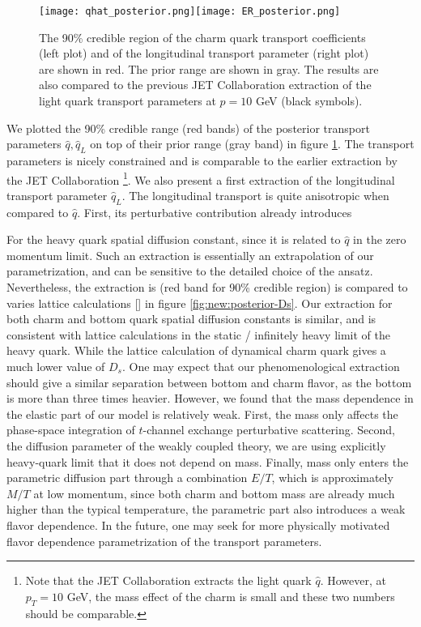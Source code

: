 \begin{figure}
\centering
\texttt{[image: qhat\_posterior.png]}\texttt{[image: ER\_posterior.png]}
\caption{The 90\% credible region of the charm quark transport coefficients (left plot) and of the longitudinal transport parameter (right plot) are shown in red. The prior range are shown in gray. The results are also compared to the previous JET Collaboration extraction of the light quark transport parameters at $p=10$ GeV (black symbols). }
\label{fig:new:posterior-qhat}
\end{figure}

We plotted the 90\% credible range (red bands) of the posterior transport parameters $\hat{q}, \hat{q}_L$ on top of their prior range (gray band) in figure \ref{fig:new:posterior-qhat}.
The transport parameters is nicely constrained and is comparable to the earlier extraction by the JET Collaboration \footnote{Note that the JET Collaboration extracts the light quark $\hat{q}$. However, at $p_T = 10$ GeV, the mass effect of the charm is small and these two numbers should be comparable.}.
We also present a first extraction of the longitudinal transport parameter $\hat{q}_L$. 
The longitudinal transport is quite anisotropic when compared to $\hat{q}$.
First, its perturbative contribution already introduces

For the heavy quark spatial diffusion constant, since it is related to $\hat{q}$ in the zero momentum limit. 
Such an extraction is essentially an extrapolation of our parametrization, and can be sensitive to the detailed choice of the ansatz.
Nevertheless, the extraction is (red band for 90\% credible region) is compared to varies lattice calculations [] in  figure \ref{fig:new:posterior-Ds}.
Our extraction for both charm and bottom quark spatial diffusion constants is similar, and is consistent with lattice calculations in the static / infinitely heavy limit of the heavy quark.
While the lattice calculation of dynamical charm quark gives a much lower value of $D_s$.
One may expect that our phenomenological extraction should give a similar separation between bottom and charm flavor, as the bottom is more than three times heavier.
However, we found that the mass dependence in the elastic part of our model is relatively weak. 
First, the mass only affects the phase-space integration of $t$-channel exchange perturbative scattering.
Second, the diffusion parameter of the weakly coupled theory, we are using explicitly heavy-quark limit that it does not depend on mass.
Finally, mass only enters the parametric diffusion part through a combination $E/T$, which is approximately $M/T$ at low momentum, since both charm and bottom mass are already much higher than the typical temperature, the parametric part also introduces a weak flavor dependence.
In the future, one may seek for more physically motivated flavor dependence parametrization of the transport parameters.

